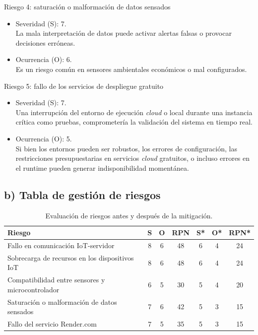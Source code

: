 \documentclass[
11pt, %
]{charter}
\begin{document}
Riesgo 4: saturación o malformación de datos sensados

\begin{itemize}
	\item Severidad (S): 7.\\
	La mala interpretación de datos puede activar alertas falsas o provocar decisiones erróneas.
	\item Ocurrencia (O): 6.\\
	Es un riesgo común en sensores ambientales económicos o mal configurados.
\end{itemize}

Riesgo 5: fallo de los servicios de despliegue gratuito

\begin{itemize}
	\item Severidad (S): 7.\\
	Una interrupción del entorno de ejecución \textit{cloud} o local durante una instancia crítica como pruebas, comprometería la validación del sistema en tiempo real.
	\item Ocurrencia (O): 5.\\
	Si bien los entornos pueden ser robustos, los errores de configuración, las restricciones presupuestarias en servicios \textit{cloud} gratuitos, o incluso errores en el runtime pueden generar indisponibilidad momentánea.
\end{itemize}

\subsection*{b) Tabla de gestión de riesgos}

\begin{table}[htpb]
\centering
\begin{tabularx}{\linewidth}{@{}|X|c|c|c|c|c|c|@{}}
\hline
\rowcolor[HTML]{C0C0C0} 
\textbf{Riesgo} & \textbf{S} & \textbf{O} & \textbf{RPN} & \textbf{S*} & \textbf{O*} & \textbf{RPN*} \\ \hline
Fallo en comunicación IoT-servidor & 8 & 6 & 48 & 6 & 4 & 24 \\ \hline
Sobrecarga de recursos en los dispositivos IoT & 8 & 6 & 48 & 6 & 4 & 24 \\ \hline
Compatibilidad entre sensores y microcontrolador & 6 & 5 & 30 & 5 & 4 & 20 \\ \hline
Saturación o malformación de datos sensados & 7 & 6 & 42 & 5 & 3 & 15 \\ \hline
Fallo del servicio Render.com & 7 & 5 & 35 & 5 & 3 & 15 \\ \hline
\end{tabularx}
\caption{Evaluación de riesgos antes y después de la mitigación.}
\end{table}
\end{document}
